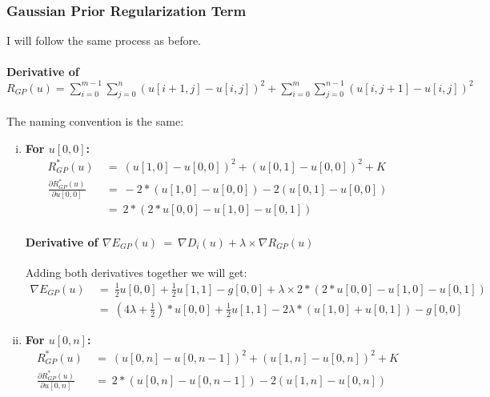 \documentclass{report}
\begin{document}
			\subsubsection{Gaussian Prior Regularization Term}
			\startsubsection
				I will follow the same process as before.
				\vspace{-0.4cm} \paragraph{Derivative of $R_{GP}(u) = \sum_{i=0}^{m-1} \sum_{j=0}^{n} ( u[i+1,j] - u[i,j] )^2 + \sum_{i=0}^{m} \sum_{j=0}^{n-1} ( u[i,j+1] - u[i,j] )^2$}
				\startsubsection
					\vspace{0.2cm} The naming convention is the same:
					\begin{enumerate}[(i)]
						\item \textbf{For $u[0,0]$:}
						\begin{align*}
							R_{GP}^*(u) \ & = \ (u[1,0] - u[0,0])^2 + (u[0,1] - u[0,0])^2 + K \\
							\frac{\partial R_{GP}^*(u)}{\partial u[0,0]} \ & = \ -2 * (u[1,0] - u[0,0]) - 2 (u[0,1] - u[0,0]) \\
							& = \ 2 * (2 * u[0,0] - u[1,0] - u[0,1])
						\end{align*}
						\vspace{-0.4cm} \paragraph{Derivative of $\nabla E_{GP}(u) \ = \ \nabla D_{i}(u) + \lambda \times \nabla R_{GP}(u)$}
						\startsubsection
							Adding both derivatives together we will get:
							\vspace{-0.3cm}
							\begin{align*}
								\nabla E_{GP}(u) \ & = \ \frac{1}{2} u[0,0]  + \frac{1}{2} u[1,1] - g[0,0] + \lambda \times 2 * (2 * u[0,0] - u[1,0] - u[0,1]) \\
								& = \ (4\lambda + \frac{1}{2}) * u[0,0] + \frac{1}{2} u[1,1] - 2\lambda*(u[1,0] + u[0,1]) - g[0,0]
							\end{align*}
						\closesection
						\item \textbf{For $u[0,n]$:}
						\begin{align*}
							R_{GP}^*(u) \ & = \ (u[0,n] - u[0,n-1])^2 + (u[1,n] - u[0,n])^2 + K \\
							\frac{\partial R_{GP}^*(u)}{\partial u[0,n]} \ & = \ 2 * (u[0,n] - u[0,n-1]) - 2 (u[1,n] - u[0,n]) \\

\end{align*}
\end{enumerate}
\end{document}
